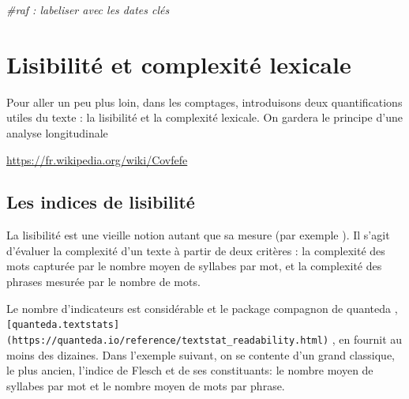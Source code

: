 \documentclass[
]{book}
\newenvironment{Shaded}{\begin{snugshade}}{\end{snugshade}}
\newcommand{\CommentTok}[1]{\textcolor[rgb]{0.56,0.35,0.01}{\textit{#1}}}
\begin{document}
\begin{Shaded}
\begin{Highlighting}[]
\CommentTok{#raf : labeliser avec les dates clés}
\end{Highlighting}
\end{Shaded}

\hypertarget{lisibilituxe9-et-complexituxe9-lexicale}{%
\section{Lisibilité et complexité lexicale}\label{lisibilituxe9-et-complexituxe9-lexicale}}

Pour aller un peu plus loin, dans les comptages, introduisons deux quantifications utiles du texte : la lisibilité et la complexité lexicale. On gardera le principe d'une analyse longitudinale

\url{https://fr.wikipedia.org/wiki/Covfefe}

\hypertarget{les-indices-de-lisibilituxe9}{%
\subsection{Les indices de lisibilité}\label{les-indices-de-lisibilituxe9}}

La lisibilité est une vieille notion autant que sa mesure (par exemple \citet{coleman_computer_1975}). Il s'agit d'évaluer la complexité d'un texte à partir de deux critères : la complexité des mots capturée par le nombre moyen de syllabes par mot, et la complexité des phrases mesurée par le nombre de mots.

Le nombre d'indicateurs est considérable et le package compagnon de quanteda , \texttt{{[}quanteda.textstats{]}(https://quanteda.io/reference/textstat\_readability.html)} , en fournit au moins des dizaines. Dans l'exemple suivant, on se contente d'un grand classique, le plus ancien, l'indice de Flesch \citep{flesch_new_1948} et de ses constituants: le nombre moyen de syllabes par mot et le nombre moyen de mots par phrase.
\end{document}
